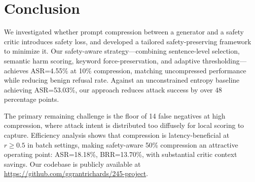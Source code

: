 \documentclass[11pt]{article}
\begin{document}
\section{Conclusion}

We investigated whether prompt compression between a generator and a safety critic introduces safety loss, and developed a tailored safety-preserving framework to minimize it. Our safety-aware strategy---combining sentence-level selection, semantic harm scoring, keyword force-preservation, and adaptive thresholding---achieves ASR=4.55\% at 10\% compression, matching uncompressed performance while reducing benign refusal rate. Against an unconstrained entropy baseline achieving ASR=53.03\%, our approach reduces attack success by over 48 percentage points.

The primary remaining challenge is the floor of 14 false negatives at high compression, where attack intent is distributed too diffusely for local scoring to capture. Efficiency analysis shows that compression is latency-beneficial at $r\geq0.5$ in batch settings, making safety-aware 50\% compression an attractive operating point: ASR=18.18\%, BRR=13.70\%, with substantial critic context savings. Our codebase is publicly available at \url{https://github.com/ggrantrichards/245-project}.



\end{document}
